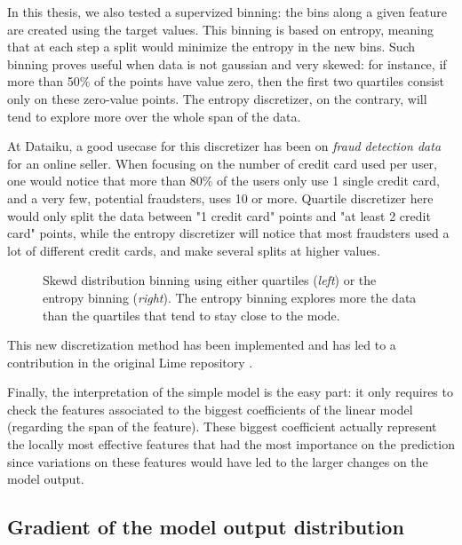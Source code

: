 \documentclass[a4paper,11pt]{kth-mag}
\begin{document}
In this thesis, we also tested a supervized binning: the bins along a given feature are created using the target values. This binning is based on entropy, meaning that at each step a split would minimize the entropy in the new bins. Such binning proves useful when data is not gaussian and very skewed: for instance, if more than 50\% of the points have value zero, then the first two quartiles consist only on these zero-value points. The entropy discretizer, on the contrary, will tend to explore more over the whole span of the data.

At Dataiku, a good usecase for this discretizer has been on \textit{fraud detection data} for an online seller. When focusing on the number of credit card used per user, one would notice that more than 80\% of the users only use 1 single credit card, and a very few, potential fraudsters, uses 10 or more. Quartile discretizer here would only split the data between "1 credit card" points and "at least 2 credit card" points, while the entropy discretizer will notice that most fraudsters used a lot of different credit cards, and make several splits at higher values.

\begin{figure}[h!]
		\centering
    	\def\svgwidth{\columnwidth}
    	
    	\caption{Skewd distribution binning using either quartiles (\textit{left}) or the entropy binning (\textit{right}). The entropy binning explores more the data than the quartiles that tend to stay close to the mode.}
\end{figure}

This new discretization method has been implemented and has led to a contribution in the original Lime repository \cite{limeGitHub}.

\vspace{1em}

Finally, the interpretation of the simple model is the easy part: it only requires to check the features associated to the biggest coefficients of the linear model (regarding the span of the feature). These biggest coefficient actually represent the locally most effective features that had the most importance on the prediction since variations on these features would have led to the larger changes on the model output.

\subsection{Gradient of the model output distribution}
\end{document}
